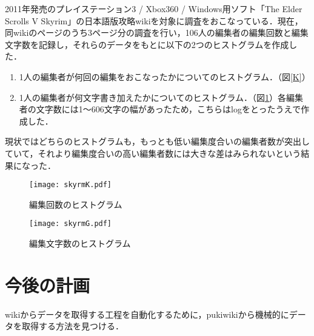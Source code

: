 \documentclass[uplatex,twocolumn,dvipdfmx]{jsarticle}
\begin{document}
2011年発売のプレイステーション3 / Xbox360 / Windows用ソフト「The Elder Scrolls V Skyrim」\cite{wikipedia}の日本語版攻略wiki\cite{wiki}を対象に調査をおこなっている．現在，同wikiのページのうち3ページ分の調査を行い，106人の編集者の編集回数と編集文字数を記録し，それらのデータをもとに以下の2つのヒストグラムを作成した．


\begin{enumerate}
\item 1人の編集者が何回の編集をおこなったかについてのヒストグラム．（図\ref{K}）
\item 1人の編集者が何文字書き加えたかについてのヒストグラム．（図\ref{G}）各編集者の文字数には1～606文字の幅があったため，こちらはlogをとったうえで作成した．
\end{enumerate}

現状ではどちらのヒストグラムも，もっとも低い編集度合いの編集者数が突出していて，それより編集度合いの高い編集者数には大きな差はみられないという結果になった．

\begin{figure}[thbp]
 \begin{minipage}{0.5\hsize}
  \begin{center}
   \texttt{[image: skyrmK.pdf]}
   \caption{編集回数のヒストグラム}
   \label{K}
  \end{center}
 \end{minipage}%
 \begin{minipage}{0.5\hsize}
  \begin{center}
   \texttt{[image: skyrmG.pdf]}
   \caption{編集文字数のヒストグラム}
   \label{G}
  \end{center}
 \end{minipage}
\end{figure}


\section{今後の計画}

wikiからデータを取得する工程を自動化するために，pukiwikiから機械的にデータを取得する方法を見つける．


\end{document}
